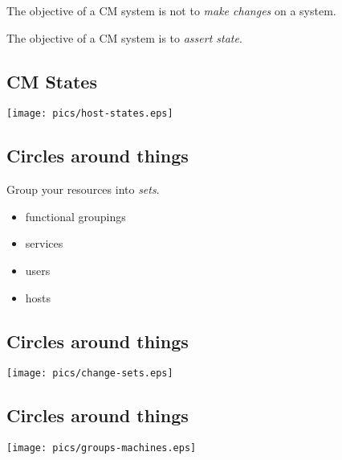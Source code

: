 \documentclass[xga]{xdvislides}
\begin{document}
The objective of a CM system is not to {\em make
changes} on a system. \\

\vspace{.5in}

The objective of a CM system is to {\em assert state}.

\subsection{CM States}
\vspace*{\fill}
\begin{center}
	\texttt{[image: pics/host-states.eps]} \\
\end{center}
\vspace*{\fill}

\subsection{Circles around things}
Group your resources into {\em sets}. \\
\vspace{.5in}

\begin{itemize}
	\item functional groupings
	\item services
	\item users
	\item hosts
\end{itemize}

\subsection{Circles around things}
\vspace*{\fill}
\begin{center}
	\texttt{[image: pics/change-sets.eps]} \\
\end{center}
\vspace*{\fill}

\subsection{Circles around things}
\vspace*{\fill}
\begin{center}
	\texttt{[image: pics/groups-machines.eps]} \\
\end{center}
\vspace*{\fill}
\end{document}
